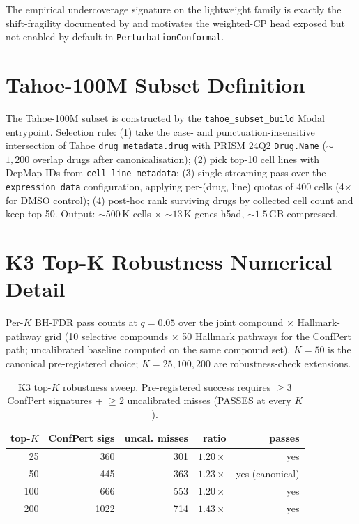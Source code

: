 \documentclass{article}
\begin{document}
The empirical undercoverage signature on the lightweight family is exactly the shift-fragility documented by \citet{tibshirani2019} and motivates the weighted-CP head exposed but not enabled by default in \texttt{PerturbationConformal}.

\section{Tahoe-100M Subset Definition}
\label{app:tahoe}

The Tahoe-100M subset is constructed by the \texttt{tahoe\_subset\_build} Modal entrypoint. Selection rule: (1) take the case- and punctuation-insensitive intersection of Tahoe \texttt{drug\_metadata.drug} with PRISM 24Q2 \texttt{Drug.Name} ($\sim$$1{,}200$ overlap drugs after canonicalisation); (2) pick top-10 cell lines with DepMap IDs from \texttt{cell\_line\_metadata}; (3) single streaming pass over the \texttt{expression\_data} configuration, applying per-(drug, line) quotas of 400 cells (4$\times$ for DMSO control); (4) post-hoc rank surviving drugs by collected cell count and keep top-50. Output: ${\sim}500$\,K cells $\times$ ${\sim}13$\,K genes h5ad, ${\sim}1.5$\,GB compressed.

\section{K3 Top-K Robustness Numerical Detail}
\label{app:k3}

Per-$K$ BH-FDR pass counts at $q = 0.05$ over the joint compound $\times$ Hallmark-pathway grid (10 selective compounds $\times$ 50 Hallmark pathways for the ConfPert path; uncalibrated baseline computed on the same compound set). $K=50$ is the canonical pre-registered choice; $K=25, 100, 200$ are robustness-check extensions.

\begin{table}[h]
\caption{K3 top-$K$ robustness sweep. Pre-registered success requires $\geq 3$ ConfPert signatures + $\geq 2$ uncalibrated misses (PASSES at every $K$).}
\label{tab:k3}
\centering
\small
\begin{tabular}{rrrrr}
\toprule
top-$K$ & ConfPert sigs & uncal. misses & ratio & passes \\
\midrule
25  & 360  & 301 & $1.20\times$ & yes \\
50  & 445  & 363 & $1.23\times$ & yes (canonical) \\
100 & 666  & 553 & $1.20\times$ & yes \\
200 & 1022 & 714 & $1.43\times$ & yes \\
\bottomrule
\end{tabular}
\end{table}
\end{document}

